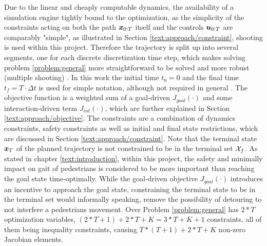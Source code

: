 Due to the linear and cheaply computable dynamics, the availability of a simulation engine tightly bound to the optimization, as the simplicity of the constraints acting on both the path $\boldsymbol{x}_{0:T}$ itself and the controls $\boldsymbol{u}_{0:T}$ are comparably "simple", as illustrated in Section \ref{text:approach/constraint}, shooting is used within this project. Therefore the trajectory is split up into several segments, one for each discrete discretization time step, which makes solving problem \ref{problem:general} more straightforward  to be solved and more robust (multiple shooting) \cite{Betts1998}. In this work the initial time $t_0 = 0$ and the final time $t_f = T \cdot \Delta t$ is used for simple notation, although not required in general \cite{Wachter2006}.
\newline
The objective function is a weighted sum of a goal-driven $J_{goal}(\cdot)$ and some interaction-driven term $J_{int}(\cdot)$, which are further explained in Section \ref{text:approach/objective}. The constraints are a combination of dynamics constraints, safety constraints as well as initial and final state restrictions, which are discussed in Section \ref{text:approach/constraint}. Note that the terminal state $\boldsymbol{x}_T$ of the planned trajectory is not constrained to be in the terminal set $\mathcal{X}_f$. As stated in chapter \ref{text:introduction}, within this project, the safety and minimally impact on gait of pedestrians is considered to be more important than reaching the goal state time-optimally. While the goal-driven objective $J_{goal}(\cdot)$ introduces an incentive to approach the goal state, constraining the terminal state to be in the terminal set would informally speaking, remove the possibility of detouring to not interfere a pedestrians movement.
\newline
Over Problem \ref{problem:general} has $2*T$ optimization variables, $(2*T + 1) + 2*T + K = 3*T + K + 1$ constraints, all of them being inequality constraints, causing $T * (T+1) + 2*T + K$ non-zero Jacobian elements.

